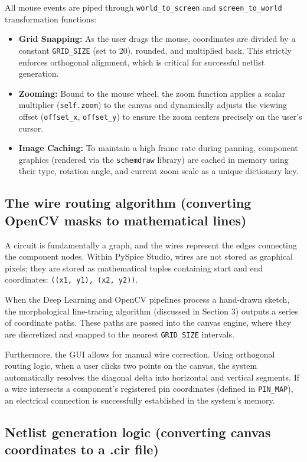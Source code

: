 \documentclass[12pt]{article}
\begin{document}
All mouse events are piped through \texttt{world\_to\_screen} and \texttt{screen\_to\_world} transformation functions:
\begin{itemize}
    \item \textbf{Grid Snapping:} As the user drags the mouse, coordinates are divided by a constant \texttt{GRID\_SIZE} (set to 20), rounded, and multiplied back. This strictly enforces orthogonal alignment, which is critical for successful netlist generation.
    \item \textbf{Zooming:} Bound to the mouse wheel, the zoom function applies a scalar multiplier (\texttt{self.zoom}) to the canvas and dynamically adjusts the viewing offset (\texttt{offset\_x}, \texttt{offset\_y}) to ensure the zoom centers precisely on the user's cursor.
    \item \textbf{Image Caching:} To maintain a high frame rate during panning, component graphics (rendered via the \texttt{schemdraw} library) are cached in memory using their type, rotation angle, and current zoom scale as a unique dictionary key.
\end{itemize}

\subsection{The wire routing algorithm (converting OpenCV masks to mathematical lines)}

A circuit is fundamentally a graph, and the wires represent the edges connecting the component nodes. Within PySpice Studio, wires are not stored as graphical pixels; they are stored as mathematical tuples containing start and end coordinates: \texttt{((x1, y1), (x2, y2))}.

When the Deep Learning and OpenCV pipelines process a hand-drawn sketch, the morphological line-tracing algorithm (discussed in Section 3) outputs a series of coordinate paths. These paths are passed into the canvas engine, where they are discretized and snapped to the nearest \texttt{GRID\_SIZE} intervals. 

Furthermore, the GUI allows for manual wire correction. Using orthogonal routing logic, when a user clicks two points on the canvas, the system automatically resolves the diagonal delta into horizontal and vertical segments. If a wire intersects a component's registered pin coordinates (defined in \texttt{PIN\_MAP}), an electrical connection is successfully established in the system's memory.

\subsection{Netlist generation logic (converting canvas coordinates to a .cir file)}
\end{document}
